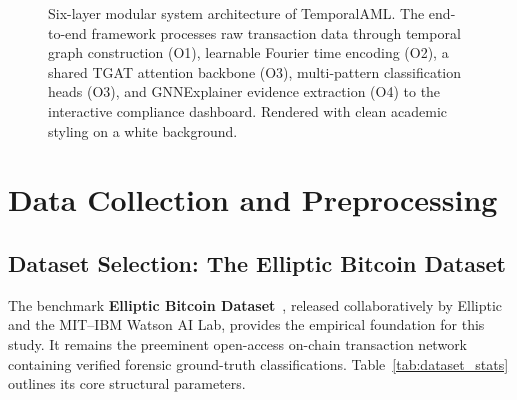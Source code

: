 \begin{figure}[!htbp]
\caption[TemporalAML System Architecture]{Six-layer modular system architecture of TemporalAML. The end-to-end framework processes raw transaction data through temporal graph construction (O1), learnable Fourier time encoding (O2), a shared TGAT attention backbone (O3), multi-pattern classification heads (O3), and GNNExplainer evidence extraction (O4) to the interactive compliance dashboard. Rendered with clean academic styling on a white background.}
\label{fig:system_arch}
\end{figure}


\section{Data Collection and Preprocessing}
\label{sec:meth_data}

\subsection{Dataset Selection: The Elliptic Bitcoin Dataset}
\label{subsec:dataset_selection}

The benchmark \textbf{Elliptic Bitcoin Dataset}~\cite{elliptic2019}, released collaboratively by Elliptic and the MIT--IBM Watson AI Lab, provides the empirical foundation for this study. It remains the preeminent open-access on-chain transaction network containing verified forensic ground-truth classifications. Table~\ref{tab:dataset_stats} outlines its core structural parameters.

